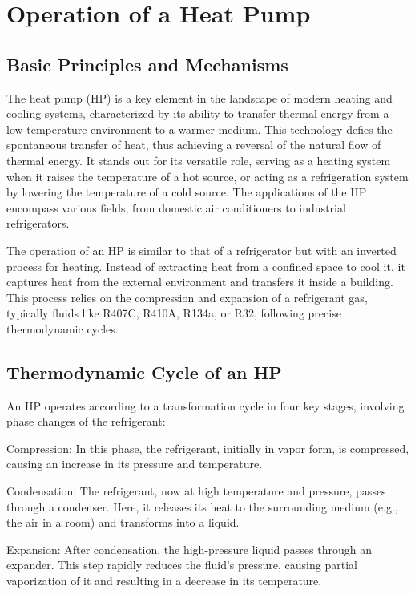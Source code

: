 \documentclass{report}
\begin{document}
\section{Operation of a Heat Pump}

\subsection{Basic Principles and Mechanisms}

The heat pump (HP) is a key element in the landscape of modern heating and cooling systems, characterized by its ability to transfer thermal energy from a low-temperature environment to a warmer medium. This technology defies the spontaneous transfer of heat, thus achieving a reversal of the natural flow of thermal energy. It stands out for its versatile role, serving as a heating system when it raises the temperature of a hot source, or acting as a refrigeration system by lowering the temperature of a cold source. The applications of the HP encompass various fields, from domestic air conditioners to industrial refrigerators.

The operation of an HP is similar to that of a refrigerator but with an inverted process for heating. Instead of extracting heat from a confined space to cool it, it captures heat from the external environment and transfers it inside a building. This process relies on the compression and expansion of a refrigerant gas, typically fluids like R407C, R410A, R134a, or R32, following precise thermodynamic cycles.

\subsection{Thermodynamic Cycle of an HP}

An HP operates according to a transformation cycle in four key stages, involving phase changes of the refrigerant:

Compression: In this phase, the refrigerant, initially in vapor form, is compressed, causing an increase in its pressure and temperature.

Condensation: The refrigerant, now at high temperature and pressure, passes through a condenser. Here, it releases its heat to the surrounding medium (e.g., the air in a room) and transforms into a liquid.

Expansion: After condensation, the high-pressure liquid passes through an expander. This step rapidly reduces the fluid's pressure, causing partial vaporization of it and resulting in a decrease in its temperature.
\end{document}
